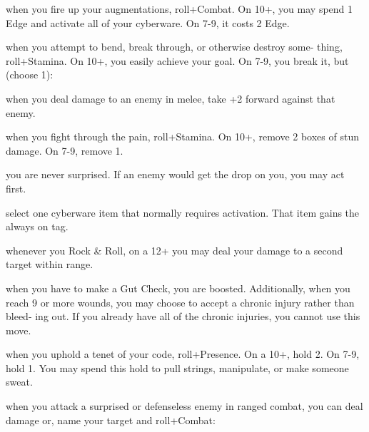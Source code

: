 \begin{dossier}
\hspace{.5cm}%
\vrule width 2pt
\hspace{.3cm}%
\begin{dossiermovebar}
\fontsize{9pt}{1em}\selectfont
\setlength{\parskip}{.2cm}
 when you fire up your augmentations, roll+Combat. On 10+, you may
spend 1 Edge and activate all of your cyberware. On 7-9, it costs 2 Edge.

 when you attempt to bend, break through, or otherwise destroy some-
thing, roll+Stamina. On 10+, you easily achieve your goal. On 7-9, you break it, but (choose
1):
\begin{moveoptions}


\end{moveoptions}

 when you deal damage to an enemy in melee, take +2 forward against
that enemy.

 when you fight through the pain, roll+Stamina. On 10+, remove 2 boxes
of stun damage. On 7-9, remove 1.

 you are never surprised. If an enemy would get the drop on
you, you may act first.

 select one cyberware item that normally requires activation. That item
gains the always on tag.

 whenever you Rock \& Roll, on a 12+ you may deal
your damage to a second target within range.

 when you have to make a Gut Check, you are boosted. Additionally, when
you reach 9 or more wounds, you may choose to accept a chronic injury rather than bleed-
ing out. If you already have all of the chronic injuries, you cannot use this move.

 when you uphold a tenet of your code, roll+Presence. On a 10+, hold
2. On 7-9, hold 1. You may spend this hold to pull strings, manipulate, or make someone
sweat.

 when you attack a surprised or defenseless enemy in ranged combat, you
can deal damage or, name your target and roll+Combat:
\begin{moveoptions}


\end{moveoptions}
\end{dossiermovebar}%
\end{dossier}

